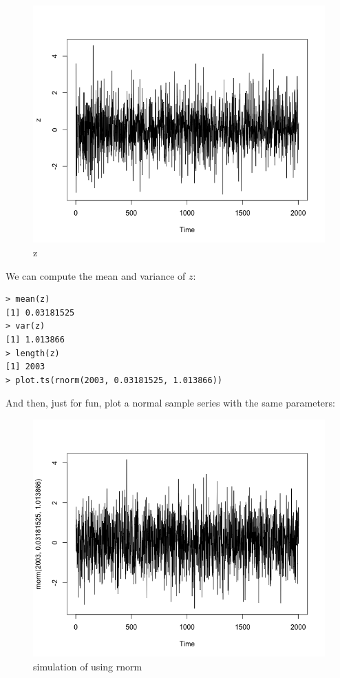 \documentclass[a4paper, 11pt]{article}
\begin{document}
\begin{figure}[H]
\centering
\caption{z}
\includegraphics[scale=.40]{z.png}
\end{figure}

\indent We can compute the mean and variance of $z$:
\begin{verbatim}
> mean(z)
[1] 0.03181525
> var(z)
[1] 1.013866
> length(z)
[1] 2003
> plot.ts(rnorm(2003, 0.03181525, 1.013866))
\end{verbatim} 
\indent And then, just for fun, plot a normal sample series with the same parameters:

\begin{figure}[H]
\centering
\caption{simulation of using rnorm}
\includegraphics[scale=.40]{rnorm.png}
\end{figure}
\end{document}
